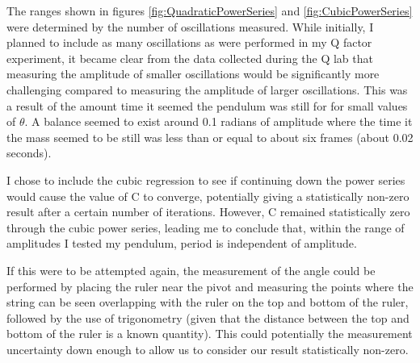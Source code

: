 \documentclass[11pt]{article}
\begin{document}
        The ranges shown in figures \ref{fig:QuadraticPowerSeries} and \ref{fig:CubicPowerSeries} were determined by the number of oscillations measured. While initially, I planned to include as many oscillations as were performed in my Q factor experiment, it became clear from the data collected during the Q lab that measuring the amplitude of smaller oscillations would be significantly more challenging compared to measuring the amplitude of larger oscillations. This was a result of the amount time it seemed the pendulum was still for for small values of $\theta$. A balance seemed to exist around 0.1 radians of amplitude where the time it the mass seemed to be still was less than or equal to about six frames (about 0.02 seconds).   

        I chose to include the cubic regression to see if continuing down the power series would cause the value of C to converge, potentially giving a statistically non-zero result after a certain number of iterations. However, C remained statistically zero through the cubic power series, leading me to conclude that, within the range of amplitudes I tested my pendulum, period is independent of amplitude. 
        
        If this were to be attempted again, the measurement of the angle could be performed by placing the ruler near the pivot and measuring the points where the string can be seen overlapping with the ruler on the top and bottom of the ruler, followed by the use of trigonometry (given that the distance between the top and bottom of the ruler is a known quantity). This could potentially the measurement uncertainty down enough to allow us to consider our result statistically non-zero.
\end{document}
